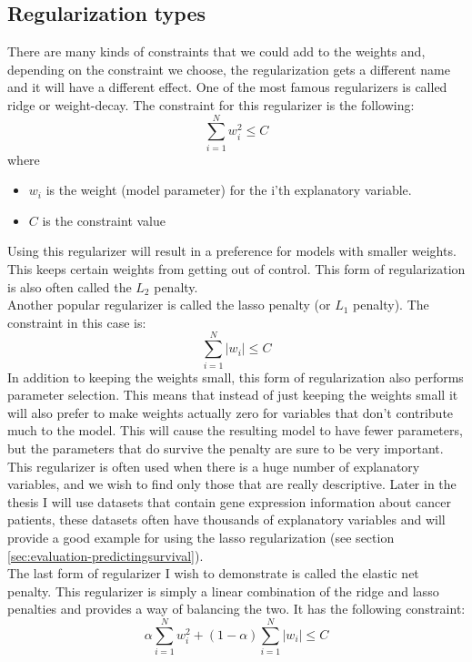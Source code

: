 \subsection{Regularization types}
There are many kinds of constraints that we could add to the weights and, depending on the constraint we choose, the regularization gets a different name and it will have a different effect. One of the most famous regularizers is called ridge or weight-decay\cite{friedman2010regularization}. The constraint for this regularizer is the following:
$$
\sum_{i=1}^{N}w_{i}^{2} \leq C
$$
where
\begin{itemize}
	\item $w_{i}$ is the weight (model parameter) for the i'th explanatory variable.
	\item $C$ is the constraint value
\end{itemize}
Using this regularizer will result in a preference for models with smaller weights. This keeps certain weights from getting out of control. This form of regularization is also often called the $L_{2}$ penalty. \\
\label{insec:glm-lasso}
Another popular regularizer is called the lasso penalty (or $L_{1}$ penalty)\cite{friedman2010regularization}. The constraint in this case is:
$$
\sum_{i=1}^{N}\lvert w_{i}\rvert \leq C
$$
In addition to keeping the weights small, this form of regularization also performs parameter selection. This means that instead of just keeping the weights small it will also prefer to make weights actually zero for variables that don't contribute much to the model. This will cause the resulting model to have fewer parameters, but the parameters that do survive the penalty are sure to be very important. This regularizer is often used when there is a huge number of explanatory variables, and we wish to find only those that are really descriptive. Later in the thesis I will use datasets that contain gene expression information about cancer patients, these datasets often have thousands of explanatory variables and will provide a good example for using the lasso regularization (see section \ref{sec:evaluation-predictingsurvival}). \\
The last form of regularizer I wish to demonstrate is called the elastic net penalty. This regularizer is simply a linear combination of the ridge and lasso penalties and provides a way of balancing the two. It has the following constraint:
$$
\alpha \sum_{i=1}^{N}w_{i}^{2} + (1-\alpha)\sum_{i=1}^{N}\lvert w_{i}\rvert \leq C
$$
